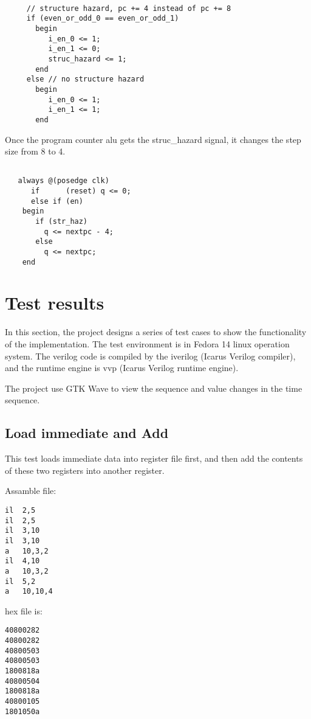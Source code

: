 \documentclass[preprint,authoryear,12pt]{elsarticle}
\begin{document}
\begin{verbatim}

	 // structure hazard, pc += 4 instead of pc += 8
	 if (even_or_odd_0 == even_or_odd_1)
	   begin
	      i_en_0 <= 1;
	      i_en_1 <= 0;
	      struc_hazard <= 1;
	   end
	 else // no structure hazard
	   begin
	      i_en_0 <= 1;
	      i_en_1 <= 1;
	   end
\end{verbatim}

Once the program counter alu gets the struc\_hazard signal, it changes the step size from 8 to 4.

\begin{verbatim}

   always @(posedge clk)
      if      (reset) q <= 0;
      else if (en)
	begin
	   if (str_haz)
	     q <= nextpc - 4;
	   else
	     q <= nextpc;
	end

\end{verbatim}

\section{Test results}

In this section, the project designs a series of test cases to show
the functionality of the implementation. The test environment is in
Fedora 14 linux operation system. The verilog code is compiled by the
iverilog (Icarus Verilog compiler), and the runtime engine is vvp
(Icarus Verilog runtime engine).

The project use GTK Wave to view the sequence and value changes in the
time sequence.

\subsection{Load immediate and Add}

This test loads immediate data into register file first, and then add
the contents of these two registers into another register.

Assamble file:

\begin{verbatim}
il	2,5
il	2,5
il	3,10
il	3,10
a	10,3,2
il	4,10
a	10,3,2
il	5,2
a	10,10,4
\end{verbatim}

hex file is:

\begin{verbatim}
40800282
40800282
40800503
40800503
1800818a
40800504
1800818a
40800105
1801050a
\end{verbatim}
\end{document}
